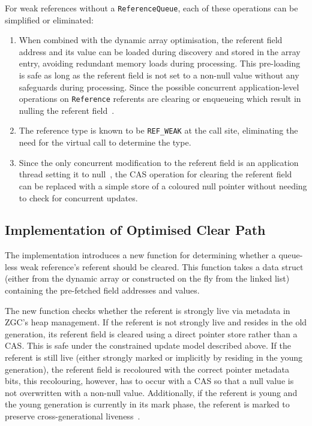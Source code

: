 For weak references without a \texttt{ReferenceQueue}, each of these operations can be simplified or eliminated:
\begin{enumerate}
    \item When combined with the dynamic array optimisation, the referent field address and its value can be loaded during discovery and stored in the array entry, avoiding redundant memory loads during processing. This pre-loading is safe as long as the referent field is not set to a non-null value without any safeguards during processing. Since the possible concurrent application-level operations on \texttt{Reference} referents are clearing or enqueueing which result in nulling the referent field~\cite{openjdk-reference-java,openjdk-zreferenceprocessor-cpp}.
    \item The reference type is known to be \texttt{REF\_WEAK} at the call site, eliminating the need for the virtual call to determine the type.
    \item Since the only concurrent modification to the referent field is an application thread setting it to null~\cite{openjdk-reference-java,openjdk-zbarrier-cpp,openjdk-zreferenceprocessor-cpp}, the CAS operation for clearing the referent field can be replaced with a simple store of a coloured null pointer without needing to check for concurrent updates.
\end{enumerate}

\subsection{Implementation of Optimised Clear Path}
\label{subsec:seq-impl}

The implementation introduces a new function for determining whether a queue-less weak reference's referent should be cleared. This function takes a data struct (either from the dynamic array or constructed on the fly from the linked list) containing the pre-fetched field addresses and values.

The new function checks whether the referent is strongly live via metadata in ZGC's heap management. If the referent is not strongly live and resides in the old generation, its referent field is cleared using a direct pointer store rather than a CAS. This is safe under the constrained update model described above. If the referent is still live (either strongly marked or implicitly by residing in the young generation), the referent field is recoloured with the correct pointer metadata bits, this recolouring, however, has to occur with a CAS so that a null value is not overwritten with a non-null value. Additionally, if the referent is young and the young generation is currently in its mark phase, the referent is marked to preserve cross-generational liveness~\cite{openjdk-zreferenceprocessor-cpp,openjdk-zbarrier-cpp,openjdk-zgeneration-cpp}.

